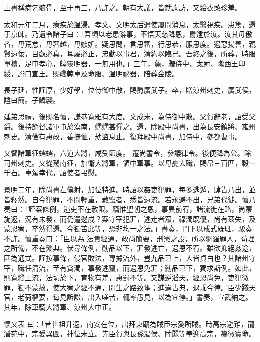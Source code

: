 \begin{pinyinscope}
 上書稱病乞骸骨，至于再三，乃許之。朝有大議，皆就詢訪，又給衣藥珍羞。



 太和元年二月，療疾於溫湯。孝文、文明太后遣使屢問消息，太醫視疾。患篤，還于京師。乃遺令諸子曰：「吾頃以老患辭事，不悟天慈降恩，爵逮於汝。汝其毋傲吝，毋荒怠，毋奢越，毋嫉妒。疑思問，言思審，行思恭，服思度。遏惡揚善，親
 賢遠佞，目觀必真，耳屬必正，忠勤以事君，清約以臨己。吾終之後，所葬，時服單櫝，足申孝心，皞靈明器，一無用也。」三年，薨，贈侍中、太尉、隴西王印綬，謚曰宣王。賜巉輬車及命服、溫明祕器，陪葬金陵。



 長子延，性謹厚，少好學，位侍御中散，賜爵廣武子。卒，贈涼州刺史，廣武侯，謚曰簡。子鱗襲。



 延弟思禮，後賜名懷，謙恭寬雅有大度。文成末，為侍御中散。父賀辭老，詔受父爵。後持節督諸軍屯於漠南，蠕蠕甚憚之。還，除殿中尚書，出為長安鎮將、雍州刺史。清儉有惠政，善撫恤，劫盜息止。復拜殿中尚書，加侍中，參都曹事。



 又督諸軍征蠕蠕，六道大將，咸受節度。
 遷尚書令，參議律令。後便降為公。除司州刺史。又從駕南征，加衛大將軍，領中軍事。以母憂去職，賜帛三百匹，穀一千石。車駕幸代，詔使者弔慰。



 景明二年，除尚書左僕射，加位特進。時詔以姦吏犯罪，每多逃遁，肆眚乃出，並皆釋然。自今犯罪，不問輕重，藏竄者，悉皆遠流。若永避不出，兄弟代徙。懷乃奏曰：「謹案條例，逃吏不在赦限。竊惟聖朝之恩，事異前宥，諸流徙在路，尚蒙旋返，況有未發，而仍遣邊戍？案守宰犯罪，逃走者眾，祿潤既優，尚有茲失，及蒙恩宥，卒然得還。今獨苦此等，恐非均一之法。」書奏，門下以成式既班，駁奏不許。懷重奏曰：「臣以為
 法貴經通，政尚簡要，刑憲之設，所以網羅罪人，茍理之所備，不在繁典。伏尋條例，勛品以下，罪發逃亡，遇恩不宥。雖欲抑絕姦途，匪為通式。謹按事條，侵官敗法，專據流外，豈九品已上，人皆貞白也？其諸州守宰，職任清流，至有貪濁，事發逃竄，而遇恩免罪；勳品已下，獨求斯例。如此，則寬縱上流，法切於下，育物有差，惠罰不等。又謀逆滔天，經恩尚免，吏犯微罪，獨不蒙赦，使大宥之經不通，開生之路致壅；進違古典，退乖今律。臣少踐天官，老荷樞要，每見訴訟，出入嗟苦，輒率愚見，以為宜停。」書奏，宣武納之。其年，除車騎大將軍、涼州大中正。



 懷又表
 曰：「昔世祖升遐，南安在位，出拜東廟為賊臣宗愛所賊。時高宗避難，龍潛苑中，宗愛異圖，神位未立。先臣賀與長孫渴侯、陸麗等奉迎高宗，纂徽寶命。




\end{pinyinscope}
